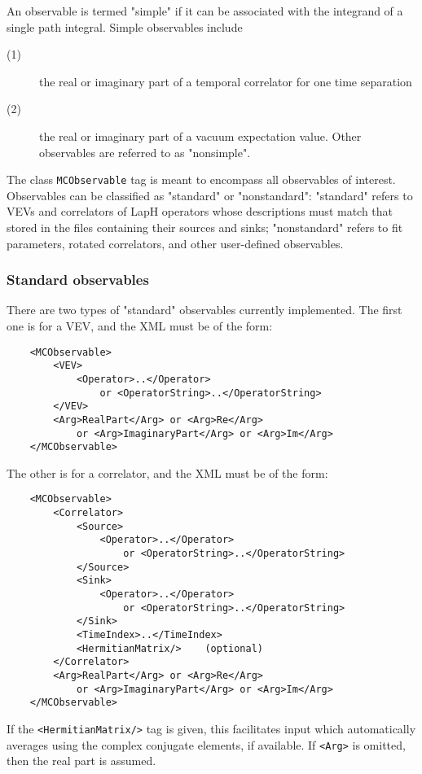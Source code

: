 \documentclass[12pt]{article}
\newcommand{\vb}{\texttt}
\begin{document}
An observable is termed "simple" if it can be associated with
the integrand of a single path integral.  Simple observables include
\begin{description}
\item[(1)] the real or imaginary part of a temporal correlator
for one time separation
\item[(2)] the real or imaginary part of a vacuum expectation value.
Other observables are referred to as "nonsimple".
\end{description}

The class \vb{MCObservable} tag is meant to encompass all observables
of interest.  Observables can be classified as "standard"
or "nonstandard":  "standard" refers to VEVs and correlators
of LapH operators whose descriptions must match that stored
in the files containing their sources and sinks; "nonstandard"
refers to fit parameters, rotated correlators, and other
user-defined observables.

\subsubsection{Standard observables}

There are two types of "standard" observables currently
implemented. The first one is for a VEV, and the XML
must be of the form:
\begin{verbatim}
    <MCObservable>
        <VEV>
            <Operator>..</Operator>
                or <OperatorString>..</OperatorString>
        </VEV>
        <Arg>RealPart</Arg> or <Arg>Re</Arg>
            or <Arg>ImaginaryPart</Arg> or <Arg>Im</Arg>
    </MCObservable>
\end{verbatim}
The other is for a correlator, and the XML must be of the form:
\begin{verbatim}
    <MCObservable>
        <Correlator>
            <Source>
                <Operator>..</Operator>
                    or <OperatorString>..</OperatorString>
            </Source>
            <Sink>
                <Operator>..</Operator>
                    or <OperatorString>..</OperatorString>
            </Sink>
            <TimeIndex>..</TimeIndex>
            <HermitianMatrix/>    (optional)
        </Correlator>
        <Arg>RealPart</Arg> or <Arg>Re</Arg>
            or <Arg>ImaginaryPart</Arg> or <Arg>Im</Arg>
    </MCObservable>
\end{verbatim}
If the \vb{<HermitianMatrix/>} tag is given, this facilitates
input which automatically averages using the complex
conjugate elements, if available.  If \vb{<Arg>} is omitted, then
the real part is assumed.
\end{document}
